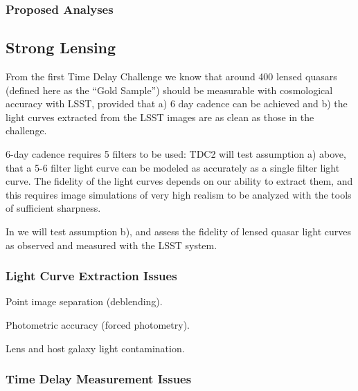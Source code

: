 \subsubsection{Proposed Analyses}
\label{\secname:supernovae:analyses}



\subsection{Strong Lensing}
\label{\secname:stronglensing}

From the first Time Delay Challenge we know that around 400 lensed
quasars (defined here as the ``Gold Sample'') should be measurable
with cosmological accuracy with LSST, provided that a) 6 day cadence
can be achieved and b) the light curves extracted from the LSST images
are as clean as those in the challenge.

6-day cadence requires 5 filters to be used: TDC2 will test
assumption a) above, that  a 5-6 filter light curve can be modeled as
accurately as a single filter light curve. The fidelity of the light
curves depends on our ability to extract them, and this requires image
simulations of very high realism to be analyzed with the tools of
sufficient sharpness.

In \TwinklesOne we will test assumption b), and assess the fidelity of
lensed quasar light curves as observed and measured with the LSST system.


\subsubsection{Light Curve Extraction Issues}
\label{\secname:stronglensing:monitor}

Point image separation (deblending).

Photometric accuracy (forced photometry).

Lens and host galaxy light contamination.



\subsubsection{Time Delay Measurement Issues}
\label{\secname:stronglensing:timedelay}

